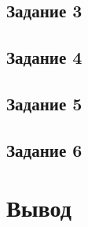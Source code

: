 \documentclass[a4paper,14pt]{extarticle}
\begin{document}
	\subsection*{Задание 3}
	
	\subsection*{Задание 4}
	
	\subsection*{Задание 5}
	
	\subsection*{Задание 6}
	
	\section*{Вывод}
	
\end{document}
